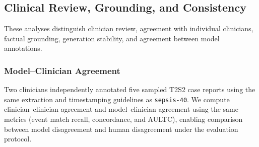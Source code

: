 
\subsection{Clinical Review, Grounding, and Consistency}\label{ch05:apd:clinical-validation}

These analyses distinguish clinician review, agreement with individual clinicians, factual grounding, generation stability, and agreement between model annotations.



\subsubsection{Model--Clinician Agreement}

Two clinicians independently annotated five sampled T2S2 case reports using the same extraction and timestamping guidelines as \texttt{sepsis-40}.
We compute clinician--clinician agreement and model--clinician agreement using the same metrics (event match recall, concordance, and AULTC), enabling comparison between model disagreement and human disagreement under the evaluation protocol.




